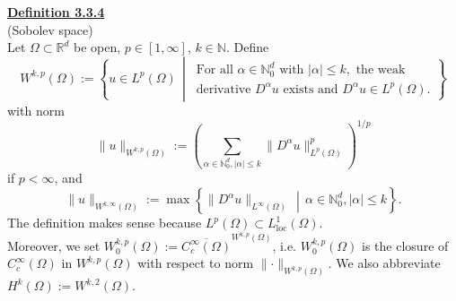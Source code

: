 \textbf{\underline{Definition 3.3.4}}\\
(Sobolev space)\\
Let $\Omega\subset\mathbb{R}^d$ be open, $p\in[1,\infty]$, $k\in\mathbb{N}$. Define
\[W^{k,p}(\Omega):=\left\{u\in L^p(\Omega)\,\middle\vert\,\begin{array}{c}
	\text{For all }\alpha\in\mathbb{N}_0^d\text{ with }\lvert\alpha\rvert\leq k,\text{ the weak}\\
	\text{derivative }D^\alpha u\text{ exists and }D^\alpha u\in L^p(\Omega).
\end{array}\right\}\]
with norm
\[\lVert u\rVert_{W^{k,p}(\Omega)}:=\left(\sum_{\alpha\in\mathbb{N}_0^d,\lvert\alpha\rvert\leq k}{\lVert D^\alpha u\rVert_{L^p(\Omega)}^p}\right)^{1/p}\]
if $p<\infty$, and
\[\lVert u\rVert_{W^{k,\infty}(\Omega)}:=\max\left\{\lVert D^\alpha u\rVert_{L^\infty(\Omega)}\,\middle\vert\,\alpha\in\mathbb{N}_0^d,\lvert\alpha\rvert\leq k\right\}.\]
The definition makes sense because $L^p(\Omega)\subset L_\text{loc}^1(\Omega)$.\\

Moreover, we set $W_0^{k,p}(\Omega):=\overline{C_c^\infty(\Omega)}^{W^{k,p}(\Omega)}$, i.e. $W_0^{k,p}(\Omega)$ is the closure of $C_c^\infty(\Omega)$ in $W^{k,p}(\Omega)$ with respect to norm $\lVert\cdot\rVert_{W^{k,p}(\Omega)}$. We also abbreviate $H^k(\Omega):=W^{k,2}(\Omega)$.\\[11pt]

